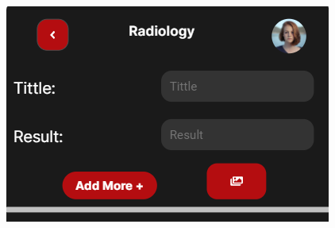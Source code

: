\documentclass[14pt]{beamer}
\begin{document}
\begin{frame}
\begin{columns}
\begin{column}{0.5\textwidth}
\begin{center}
\end{center}
\end{column}
\begin{column}{0.5\textwidth}
\begin{center}

\includegraphics[scale = 0.55]{Images/photoExampleZoom.png}

\end{center}
\end{column}
\end{columns}

\end{frame}
\end{document}
